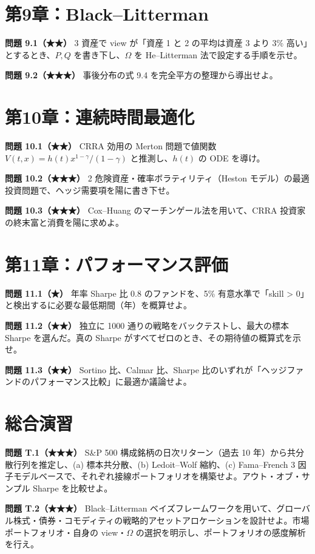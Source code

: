 \documentclass[11pt,a4paper]{report}
\begin{document}
\section{第9章：Black–Litterman}

\textbf{問題 9.1（★★）} 3 資産で view が「資産 1 と 2 の平均は資産 3 より 3\% 高い」とするとき、$P, Q$ を書き下し、$\Omega$ を He–Litterman 法で設定する手順を示せ。

\textbf{問題 9.2（★★★）} 事後分布の式 9.4 を完全平方の整理から導出せよ。

\section{第10章：連続時間最適化}

\textbf{問題 10.1（★★）} CRRA 効用の Merton 問題で値関数 $V(t, x) = h(t) x^{1-\gamma}/(1-\gamma)$ と推測し、$h(t)$ の ODE を導け。

\textbf{問題 10.2（★★★）} 2 危険資産・確率ボラティリティ（Heston モデル）の最適投資問題で、ヘッジ需要項を陽に書き下せ。

\textbf{問題 10.3（★★★）} Cox–Huang のマーチンゲール法を用いて、CRRA 投資家の終末富と消費を陽に求めよ。

\section{第11章：パフォーマンス評価}

\textbf{問題 11.1（★）} 年率 Sharpe 比 0.8 のファンドを、5\% 有意水準で「skill > 0」と検出するに必要な最低期間（年）を概算せよ。

\textbf{問題 11.2（★★）} 独立に 1000 通りの戦略をバックテストし、最大の標本 Sharpe を選んだ。真の Sharpe がすべてゼロのとき、その期待値の概算式を示せ。

\textbf{問題 11.3（★★）} Sortino 比、Calmar 比、Sharpe 比のいずれが「ヘッジファンドのパフォーマンス比較」に最適か議論せよ。

\section{総合演習}

\textbf{問題 T.1（★★★）} S\&P 500 構成銘柄の日次リターン（過去 10 年）から共分散行列を推定し、(a) 標本共分散、(b) Ledoit–Wolf 縮約、(c) Fama–French 3 因子モデルベースで、それぞれ接線ポートフォリオを構築せよ。アウト・オブ・サンプル Sharpe を比較せよ。

\textbf{問題 T.2（★★★）} Black–Litterman ベイズフレームワークを用いて、グローバル株式・債券・コモディティの戦略的アセットアロケーションを設計せよ。市場ポートフォリオ・自身の view・$\Omega$ の選択を明示し、ポートフォリオの感度解析を行え。
\end{document}
